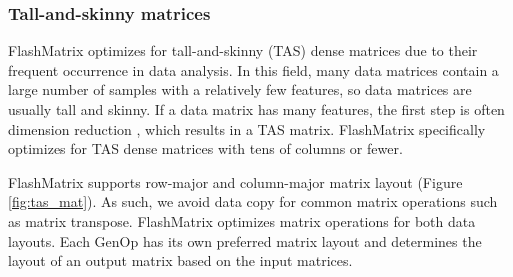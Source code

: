 

\subsubsection{Tall-and-skinny matrices} \label{sec:tas_mat}

FlashMatrix optimizes for tall-and-skinny (TAS) dense matrices due to their
frequent occurrence in data analysis. In this field, many data matrices contain
a large number of samples with a relatively few features, so
data matrices are usually tall and skinny. If a data matrix has many
features, the first step is often dimension reduction \cite{Jain00}, which
results in a TAS matrix. FlashMatrix specifically optimizes for TAS dense
matrices with tens of columns or fewer.

FlashMatrix supports row-major and column-major matrix layout (Figure
\ref{fig:tas_mat}). As such, we avoid data copy for common matrix operations
such as matrix transpose. FlashMatrix optimizes matrix operations for both
data layouts. Each GenOp has its own preferred matrix layout and determines
the layout of an output matrix based on the input matrices.


